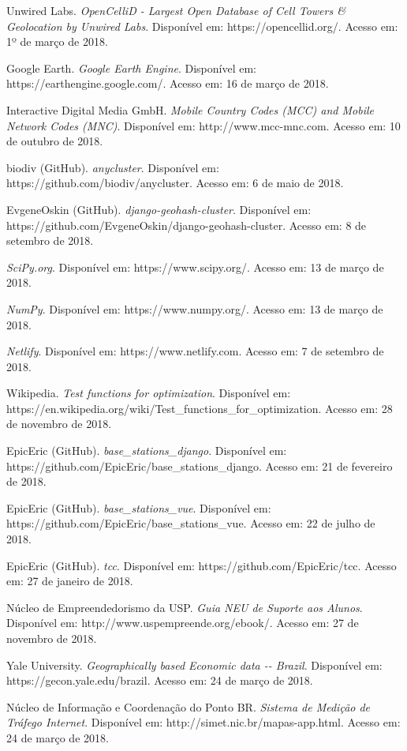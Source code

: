 \documentclass[]{politex}
\begin{document}
\begin{thebibliography}{9}
    Unwired Labs.
    \textit{OpenCelliD - Largest Open Database of Cell Towers \&
    Geolocation by Unwired Labs}.
    Disponível em: https://opencellid.org/.
    Acesso em: 1º de março de 2018.

    Google Earth.
    \textit{Google Earth Engine}.
    Disponível em: https://earthengine.google.com/.
    Acesso em: 16 de março de 2018.

    Interactive Digital Media GmbH.
    \textit{Mobile Country Codes (MCC) and Mobile Network Codes (MNC)}.
    Disponível em: http://www.mcc-mnc.com.
    Acesso em: 10 de outubro de 2018.

    biodiv (GitHub).
    \textit{anycluster}.
    Disponível em: https://github.com/biodiv/anycluster.
    Acesso em: 6 de maio de 2018.

    EvgeneOskin (GitHub).
    \textit{django-geohash-cluster}.
    Disponível em: https://github.com/EvgeneOskin/django-geohash-cluster.
    Acesso em: 8 de setembro de 2018.

    \textit{SciPy.org}.
    Disponível em: https://www.scipy.org/.
    Acesso em: 13 de março de 2018.

    \textit{NumPy}.
    Disponível em: https://www.numpy.org/.
    Acesso em: 13 de março de 2018.

    \textit{Netlify}.
    Disponível em: https://www.netlify.com.
    Acesso em: 7 de setembro de 2018.

    Wikipedia.
    \textit{Test functions for optimization}.
    Disponível em:
    https://en.wikipedia.org/wiki/Test\_functions\_for\_optimization.
    Acesso em: 28 de novembro de 2018.

    EpicEric (GitHub).
    \textit{base\_stations\_django}.
    Disponível em: https://github.com/EpicEric/base\_stations\_django.
    Acesso em: 21 de fevereiro de 2018.

    EpicEric (GitHub).
    \textit{base\_stations\_vue}.
    Disponível em: https://github.com/EpicEric/base\_stations\_vue.
    Acesso em: 22 de julho de 2018.

    EpicEric (GitHub).
    \textit{tcc}.
    Disponível em: https://github.com/EpicEric/tcc.
    Acesso em: 27 de janeiro de 2018.

    Núcleo de Empreendedorismo da USP.
    \textit{Guia NEU de Suporte aos Alunos}.
    Disponível em: http://www.uspempreende.org/ebook/.
    Acesso em: 27 de novembro de 2018.

    Yale University.
    \textit{Geographically based Economic data -{}- Brazil}.
    Disponível em: https://gecon.yale.edu/brazil.
    Acesso em: 24 de março de 2018.

    Núcleo de Informação e Coordenação do Ponto BR.
    \textit{Sistema de Medição de Tráfego Internet}.
    Disponível em: http://simet.nic.br/mapas-app.html.
    Acesso em: 24 de março de 2018.

\end{thebibliography}
\end{document}
